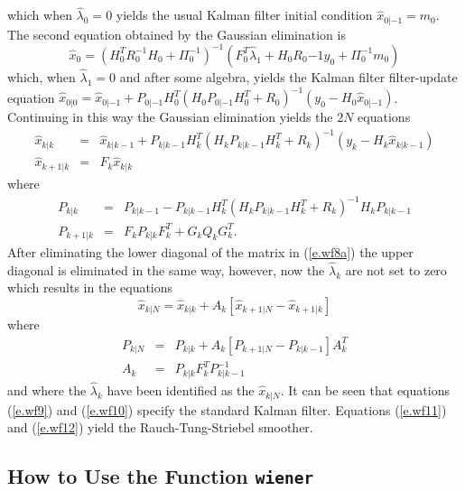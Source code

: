 %
which when $\hat{\lambda}_0=0$ yields the usual Kalman filter initial 
condition $\hat{x}_{0|-1}=m_0$.  The second equation obtained by the
Gaussian elimination is
%
\begin{equation}
\hat{x}_0=(H_0^TR_0^{-1}H_0+\Pi_0^{-1})^{-1}(F_0^T\hat{\lambda}_1+H_0R_0{-1}y_0+\Pi_0^{-1}m_0)
\label{e.wf8.c}
\end{equation}
%
which, when $\hat{\lambda}_1=0$ and after some algebra,
yields the Kalman filter 
filter-update equation 
$\hat{x}_{0|0}=\hat{x}_{0|-1}
+P_{0|-1}H_0^T(H_0P_{0|-1}H_0^T+R_0)^{-1}(y_0-H_0\hat{x}_{0|-1})$.
Continuing in this way  the Gaussian elimination yields the $2N$ equations
%
\begin{eqnarray}
\hat{x}_{k|k}&=&\hat{x}_{k|k-1}+P_{k|k-1}H_k^T(H_kP_{k|k-1}H_k^T+R_k)^{-1}(y_k-H_k\hat{x}_{k|k-1})\nonumber\\
\hat{x}_{k+1|k}&=&F_k\hat{x}_{k|k}
\label{e.wf9}
\end{eqnarray}
%
where
%
\begin{eqnarray}
P_{k|k}&=&P_{k|k-1}-P_{k|k-1}H_k^T(H_kP_{k|k-1}H_k^T+R_k)^{-1}H_kP_{k|k-1}\nonumber\\
P_{k+1|k}&=&F_kP_{k|k}F_k^T+G_kQ_kG_k^T.
\label{e.wf10}
\end{eqnarray}
%
After eliminating the lower diagonal of the matrix in (\ref{e.wf8a})
the upper diagonal is eliminated in the same way, however, now the 
$\hat{\lambda}_k$ are not set to zero which results in the equations
%
\begin{equation}
\hat{x}_{k|N}=\hat{x}_{k|k}+A_k[\hat{x}_{k+1|N}-\hat{x}_{k+1|k}]
\label{e.wf11}
\end{equation}
%
where
%
\begin{eqnarray}
P_{k|N}&=&P_{k|k}+A_k[P_{k+1|N}-P_{k|k-1}]A_k^T\nonumber\\
A_k&=&P_{k|k}F_k^TP_{k|k-1}^{-1}
\label{e.wf12}
\end{eqnarray}
%
and where the $\hat{\lambda}_k$ have been identified as the $\hat{x}_{k|N}$.
It can be seen that equations (\ref{e.wf9}) and (\ref{e.wf10}) specify
the standard Kalman filter.  Equations (\ref{e.wf11}) and (\ref{e.wf12})
yield the Rauch-Tung-Striebel smoother.

\subsection{How to Use the Function {\tt wiener}}

